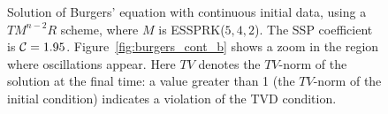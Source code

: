 \begin{figure}
    \centering
    \caption{Solution of Burgers' equation with continuous initial data, using a 
    $TM^{n-2}R$ scheme, where $ M $ is ESSPRK($5,4,2$). 
    The SSP coefficient is $\mathcal{C} = 1.95$. 
    Figure~\ref{fig:burgers_cont_b} shows a zoom in the region where 
    oscillations appear.
    Here $TV$ denotes the $TV$-norm of the solution at the final time:
    a value greater than 1 (the $TV$-norm of the initial condition)
    indicates a violation of the TVD condition.
    }
    \label{fig:burgers_cont}
\end{figure}

